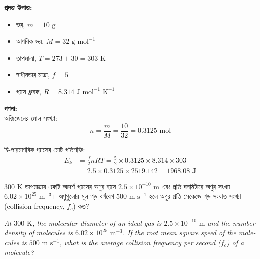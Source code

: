 \documentclass[12pt, a4paper]{article}
\begin{document}
\begin{tcolorbox}[solutionbox={সমাধান (Solution)}]
    \noindent
    \textbf{প্রদত্ত উপাত্ত:}
    \begin{itemize}[leftmargin=1.5em, itemsep=0.2em]
        \item ভর, $m = 10\text{ g}$
        \item আণবিক ভর, $M = 32\text{ g mol}^{-1}$
        \item তাপমাত্রা, $T = 273 + 30 = 303\text{ K}$
        \item স্বাধীনতার মাত্রা, $f = 5$
        \item গ্যাস ধ্রুবক, $R = 8.314\text{ J mol}^{-1}\text{ K}^{-1}$
    \end{itemize}

    \vspace{0.6em}
    \noindent\textbf{গণনা:} \\
    অক্সিজেনের মোল সংখ্যা:
    \[ n = \frac{m}{M} = \frac{10}{32} = 0.3125\text{ mol} \]
    
    দ্বি-পারমাণবিক গ্যাসের মোট গতিশক্তি:
    \begin{align*}
        E_k &= \frac{f}{2} n R T = \frac{5}{2} \times 0.3125 \times 8.314 \times 303 \\
        &= 2.5 \times 0.3125 \times 2519.142 = \mathbf{1968.08\text{ J}}
    \end{align*}
\end{tcolorbox}


\begin{tcolorbox}[questionbox={প্রশ্ন (Question) 10}]
    \noindent
    $300\text{ K}$ তাপমাত্রায় একটি আদর্শ গ্যাসের অণুর ব্যাস $2.5 \times 10^{-10}\text{ m}$ এবং প্রতি ঘনমিটারে অণুর সংখ্যা $6.02 \times 10^{25}\text{ m}^{-3}$। অণুগুলোর মূল গড় বর্গবেগ $500\text{ m s}^{-1}$ হলে অণুর প্রতি সেকেন্ডে গড় সংঘাত সংখ্যা (collision frequency, $f_c$) কত?
    
    \vspace{0.8em}
    \begin{english}
    \noindent\textit{\color{darkgray}
    At $300\text{ K}$, the molecular diameter of an ideal gas is $2.5 \times 10^{-10}\text{ m}$ and the number density of molecules is $6.02 \times 10^{25}\text{ m}^{-3}$. If the root mean square speed of the molecules is $500\text{ m s}^{-1}$, what is the average collision frequency per second ($f_c$) of a molecule?
    }
    \end{english}
\end{tcolorbox}
\end{document}

